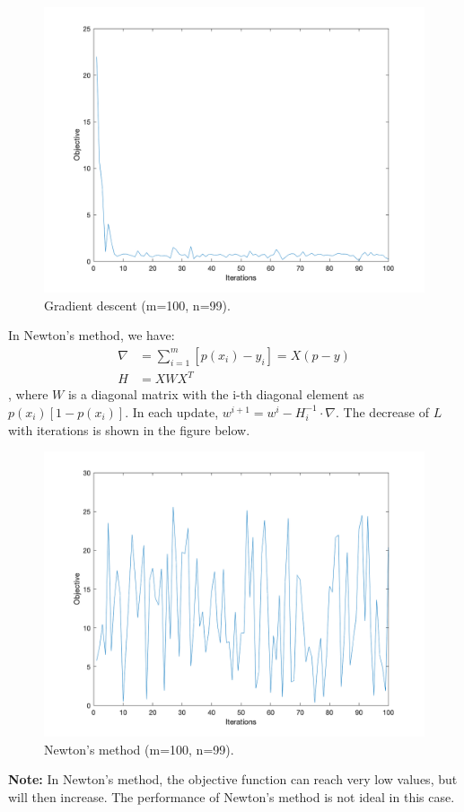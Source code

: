 \documentclass[11pt]{article}
\begin{document}
\begin{figure}[H] %
	\centering\includegraphics[width=0.6\linewidth]{fin_6_99_grd.png}
	\caption{Gradient descent (m=100, n=99).} %
	\label{fig:fig6}  %
\end{figure}
In Newton's method, we have:
\begin{equation}
	\begin{aligned}
		\nabla&=\sum_{i=1}^m[p(x_i)-y_i]=X(p-y)\\
		H&=XWX^T 
	\end{aligned}
\end{equation}
, where $W$ is a diagonal matrix with the i-th diagonal element as $p(x_i)[1-p(x_i)]$. In each update, $w^{i+1}=w^i-H_i^{-1}\cdot\nabla$. The decrease of $L$ with iterations is shown in the figure below.
\begin{figure}[H] %
	\centering\includegraphics[width=0.6\linewidth]{fin_6_99_newton.png}
	\caption{Newton's method (m=100, n=99).} %
	\label{fig:fig6}  %
\end{figure}
\textbf{Note: }In Newton's method, the objective function can reach very low values, but will then increase. The performance of Newton's method is not ideal in this case.\\
\end{document}
